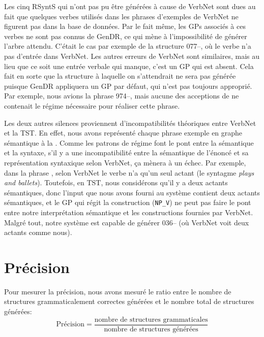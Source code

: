 Les cinq RSyntS qui n'ont pas pu être générées à cause de VerbNet sont dues au fait que quelques verbes utilisés dans les phrases d'exemples de VerbNet ne figurent pas dans la base de données. Par le fait même, les \acp{GP} associés à ces verbes ne sont pas connus de GenDR, ce qui mène à l'impossibilité de générer l'arbre attendu. C'était le cas par exemple de la structure 077--, où le verbe  n'a pas d'entrée dans VerbNet. Les autres erreurs de VerbNet sont similaires, mais au lieu que ce soit une entrée verbale qui manque, c'est un \ac{GP} qui est absent. Cela fait en sorte que la structure à laquelle on s'attendrait ne sera pas générée puisque GenDR appliquera un \ac{GP} par défaut, qui n'est pas toujours approprié. Par exemple, nous avions la phrase 974--, mais aucune des acceptions de  ne contenait le régime nécessaire pour réaliser cette phrase.

Les deux autres silences proviennent d'incompatibilités théoriques entre VerbNet et la \ac{TST}. En effet, nous avons représenté chaque phrase exemple en graphe sémantique à la \cite{mel2012semantics}. Comme les patrons de régime font le pont entre la sémantique et la syntaxe, s'il y a une incompatibilité entre la sémantique de l'énoncé et sa représentation syntaxique selon VerbNet, ça mènera à un échec. Par exemple, dans la phrase , selon VerbNet le verbe  n'a qu'un seul actant (le syntagme \emph{plays and ballets}). Toutefois, en \ac{TST}, nous considérons qu'il y a deux actants sémantiques, donc l'input que nous avons fourni au système contient deux actants sémantiques, et le \ac{GP} qui régit la construction (\texttt{NP\_V}) ne peut pas faire le pont entre notre interprétation sémantique et les constructions fournies par VerbNet. Malgré tout, notre système est capable de générer 036-- (où VerbNet voit deux actants comme nous).

\section{Précision}
Pour mesurer la précision, nous avons mesuré le ratio entre le nombre de structures grammaticalement correctes générées et le nombre total de structures générées:
\[\text{Précision} = \frac{\text{nombre de structures grammaticales}}{\text{nombre de structures générées}}\]

